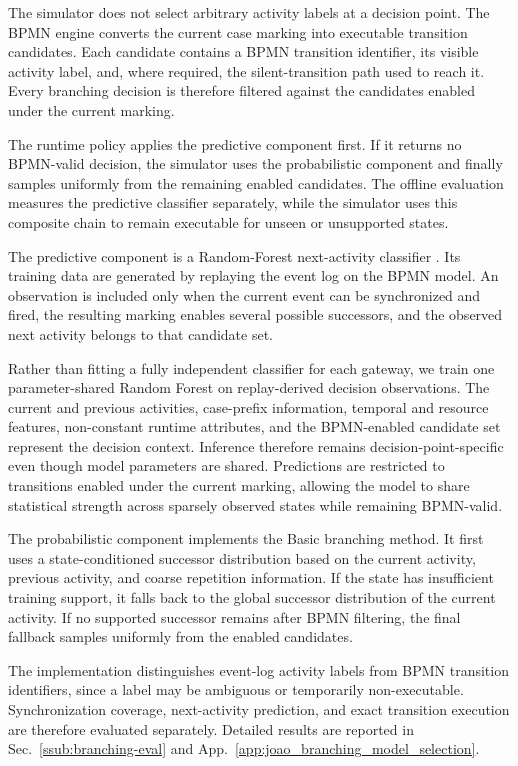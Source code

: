 The simulator does not select arbitrary activity labels at a decision point.
The BPMN engine converts the current case marking into executable transition
candidates. Each candidate contains a BPMN transition identifier, its visible
activity label, and, where required, the silent-transition path used to reach
it. Every branching decision is therefore filtered against the candidates
enabled under the current marking.

The runtime policy applies the predictive component first. If it returns no
BPMN-valid decision, the simulator uses the probabilistic component and finally
samples uniformly from the remaining enabled candidates. The offline
evaluation measures the predictive classifier separately, while the simulator
uses this composite chain to remain executable for unseen or unsupported
states.

The predictive component is a Random-Forest next-activity classifier
\cite{breiman2001randomforests,pedregosa2011scikit}. Its training data are
generated by replaying the event log on the BPMN model. An observation is
included only when the current event can be synchronized and fired, the
resulting marking enables several possible successors, and the observed next
activity belongs to that candidate set.

Rather than fitting a fully independent classifier for each gateway, we
train one parameter-shared Random Forest on replay-derived decision
observations. The current and previous activities, case-prefix information,
temporal and resource features, non-constant runtime attributes, and the
BPMN-enabled candidate set represent the decision context. Inference
therefore remains decision-point-specific even though model parameters are
shared. Predictions are restricted to transitions enabled under the current
marking, allowing the model to share statistical strength across sparsely
observed states while remaining BPMN-valid.

The probabilistic component implements the Basic branching method. It first
uses a state-conditioned successor distribution based on the current activity,
previous activity, and coarse repetition information. If the state has
insufficient training support, it falls back to the global successor
distribution of the current activity. If no supported successor remains after
BPMN filtering, the final fallback samples uniformly from the enabled
candidates.

The implementation distinguishes event-log activity labels from BPMN
transition identifiers, since a label may be ambiguous or temporarily
non-executable. Synchronization coverage, next-activity prediction, and exact
transition execution are therefore evaluated separately. Detailed results are
reported in Sec.~\ref{ssub:branching-eval} and
App.~\ref{app:joao_branching_model_selection}.